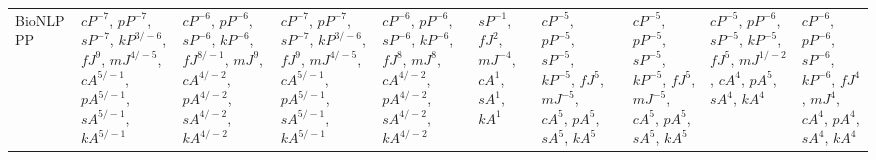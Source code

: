 \documentclass[letterpaper]{article} %
\begin{document}
\begin{sidewaystable*}
\begin{tabular}{l l l l l l l l l l l }
\multirow{10}{1.7cm}{BioNLP PP} & \multirow{10}{1.7cm}{$cP^{-7}$, $pP^{-7}$, $sP^{-7}$, $kP^{3/-6}$, $fJ^{9}$, $mJ^{4/-5}$, $cA^{5/-1}$, $pA^{5/-1}$, $sA^{5/-1}$, $kA^{5/-1}$} & \multirow{10}{1.7cm}{$cP^{-6}$, $pP^{-6}$, $sP^{-6}$, $kP^{-6}$, $fJ^{8/-1}$, $mJ^{9}$, $cA^{4/-2}$, $pA^{4/-2}$, $sA^{4/-2}$, $kA^{4/-2}$} & \multirow{10}{1.7cm}{$cP^{-7}$, $pP^{-7}$, $sP^{-7}$, $kP^{3/-6}$, $fJ^{9}$, $mJ^{4/-5}$, $cA^{5/-1}$, $pA^{5/-1}$, $sA^{5/-1}$, $kA^{5/-1}$} & \multirow{10}{1.7cm}{$cP^{-6}$, $pP^{-6}$, $sP^{-6}$, $kP^{-6}$, $fJ^{8}$, $mJ^{8}$, $cA^{4/-2}$, $pA^{4/-2}$, $sA^{4/-2}$, $kA^{4/-2}$} & \multirow{10}{1.7cm}{$sP^{-1}$, $fJ^{2}$, $mJ^{-4}$, $cA^{1}$, $sA^{1}$, $kA^{1}$} & \multirow{10}{1.7cm}{$cP^{-5}$, $pP^{-5}$, $sP^{-5}$, $kP^{-5}$, $fJ^{5}$, $mJ^{-5}$, $cA^{5}$, $pA^{5}$, $sA^{5}$, $kA^{5}$} & \multirow{10}{1.7cm}{} & \multirow{10}{1.7cm}{$cP^{-5}$, $pP^{-5}$, $sP^{-5}$, $kP^{-5}$, $fJ^{5}$, $mJ^{-5}$, $cA^{5}$, $pA^{5}$, $sA^{5}$, $kA^{5}$} & \multirow{10}{1.7cm}{$cP^{-5}$, $pP^{-6}$, $sP^{-5}$, $kP^{-5}$, $fJ^{5}$, $mJ^{1/-2}$, $cA^{4}$, $pA^{5}$, $sA^{4}$, $kA^{4}$} & \multirow{10}{1.7cm}{$cP^{-6}$, $pP^{-6}$, $sP^{-6}$, $kP^{-6}$, $fJ^{4}$, $mJ^{4}$, $cA^{4}$, $pA^{4}$, $sA^{4}$, $kA^{4}$} \\ \\ \\ \\ \\ \\ \\ \\ \\ \\
\midrule

\end{tabular}
\end{sidewaystable*}
\end{document}
